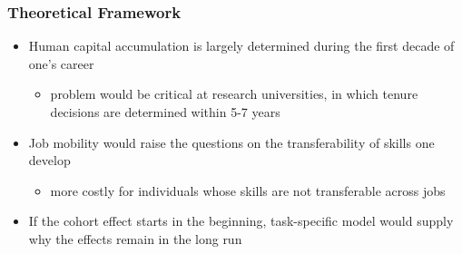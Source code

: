 \documentclass[11pt]{beamer}
\begin{document}
\begin{frame}
	\frametitle{Theoretical Framework}
	\begin{itemize}
		\item Human capital accumulation is largely determined during the first decade of one's career
		\begin{itemize}
			\item problem would be critical at research universities, in which tenure decisions are determined within 5-7 years
		\end{itemize}
		\vspace{1.5 mm}
		\item Job mobility would raise the questions on the transferability of skills one develop
		\begin{itemize}
			\item more costly for individuals whose skills are not transferable across jobs
		\end{itemize}
			\vspace{1.5 mm}
		\item If the cohort effect starts in the beginning, task-specific model would supply why the effects remain in the long run
	\end{itemize}
\end{frame}
\end{document}
